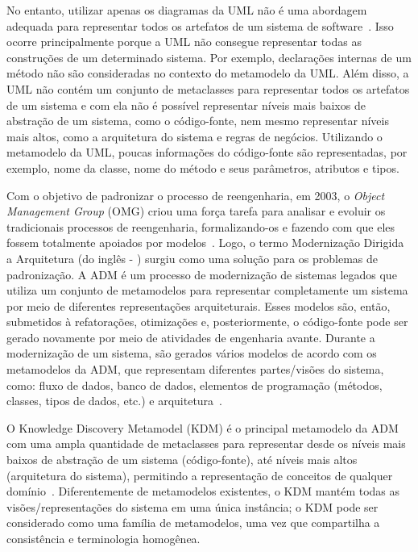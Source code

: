 No entanto, utilizar apenas os diagramas da UML não é uma abordagem adequada para representar todos os artefatos de um sistema de software~\cite{Gorp, KolahdouzRahimi20145, revisao_sistematica_uml_refactoring}. Isso ocorre principalmente porque a UML não consegue representar todas as construções de um determinado sistema. Por exemplo, declarações internas de um método não são consideradas no contexto do metamodelo da UML. Além disso, a UML não contém um conjunto de metaclasses para representar todos os artefatos de um sistema e com ela não é possível representar níveis mais baixos de abstração de um sistema, como o código-fonte, nem mesmo representar níveis mais altos, como a arquitetura do sistema e regras de negócios. Utilizando o metamodelo da UML, poucas informações do código-fonte são representadas, por exemplo, nome da classe, nome do método e seus parâmetros, atributos e tipos.  

Com o objetivo de padronizar o processo de reengenharia, em 2003, o \textit{Object Management Group} (OMG) criou uma força tarefa para analisar e evoluir os tradicionais processos de reengenharia, formalizando-os e fazendo com que eles fossem totalmente apoiados por modelos~\cite{ADM:OMG}. Logo, o termo Modernização Dirigida a Arquitetura (do inglês - ) surgiu como uma solução para os problemas de padronização. A ADM é um processo de modernização de sistemas legados que utiliza um conjunto de metamodelos para representar completamente um sistema por meio de diferentes representações arquiteturais. Esses modelos são, então, submetidos à refatorações, otimizações e, posteriormente, o código-fonte pode ser gerado novamente por meio de atividades de engenharia avante. Durante a modernização de um sistema, são gerados vários modelos de acordo com os metamodelos da ADM, que representam diferentes partes/visões do sistema, como: fluxo de dados, banco de dados, elementos de programação (métodos, classes, tipos de dados, etc.) e arquitetura~\cite{PerezCastillo20121370}.

O Knowledge Discovery Metamodel (KDM) é o principal metamodelo da ADM com uma ampla quantidade de metaclasses para representar desde os níveis mais baixos de abstração de um sistema (código-fonte), até níveis mais altos (arquitetura do sistema), permitindo a representação de conceitos de qualquer domínio~\cite{KDM:specification,KDM:ISO}. Diferentemente de metamodelos existentes, o KDM mantém todas as visões/representações do sistema em uma única instância; o KDM pode ser considerado como uma família de metamodelos, uma vez que compartilha a consistência e terminologia homogênea. 

